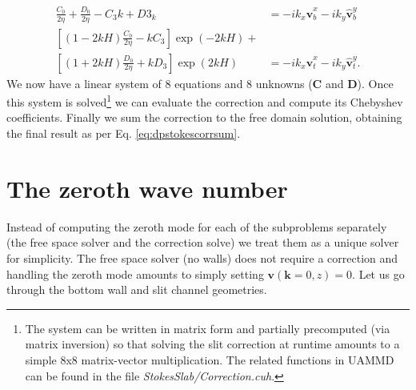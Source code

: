 \documentclass[ twoside,openright,titlepage,numbers=noenddot,%
headinclude,footinclude,cleardoublepage=empty,abstract=on,
BCOR=5mm,paper=b5,fontsize=11pt, dvipsnames
]{scrreprt}
\renewcommand{\vec}[1]{\bm{#1}}
\newcommand{\uammd}{\gls{UAMMD}\xspace}
\newcommand{\fou}[1]{\widehat{#1}}
\newcommand{\fvel}{v}
\begin{document}
\begin{equation}
  \begin{aligned}
    \frac{C_0}{2\eta} + \frac{D_0}{2\eta} - C_3k + D3_k &= -ik_x\fou{\vec{\fvel}}_b^x - ik_y\fou{\vec{\fvel}}_b^y\\
    \left[(1-2kH)\frac{C_0}{2\eta}-kC_3\right]\exp(-2kH) +&\\ \left[(1+2kH)\frac{D_0}{2\eta} + kD_3\right]\exp(2kH) &= -ik_x\fou{\vec{\fvel}}_t^x - ik_y\fou{\vec{\fvel}}_t^y.
\end{aligned}
\end{equation}
We now have a linear system of 8 equations and 8 unknowns ($\vec{C}$ and $\vec{D}$). Once this system is solved\footnote{The system can be written in matrix form and partially precomputed (via matrix inversion) so that solving the slit correction at runtime amounts to a simple 8x8 matrix-vector multiplication. The related functions in \uammd can be found in the file \emph{StokesSlab/Correction.cuh}.} we can evaluate the correction and compute its Chebyshev coefficients. Finally we sum the correction to the free domain solution, obtaining the final result as per Eq. \eqref{eq:dpstokescorrsum}.

\section{The zeroth wave number}
Instead of computing the zeroth mode for each of the subproblems separately (the free space solver and the correction solve) we treat them as a unique solver for simplicity. The free space solver (no walls) does not require a correction and handling the zeroth mode amounts to simply setting $\vec{\fvel}(\vec{k}=0,z) = 0$. Let us go through the bottom wall and slit channel geometries.
\end{document}

